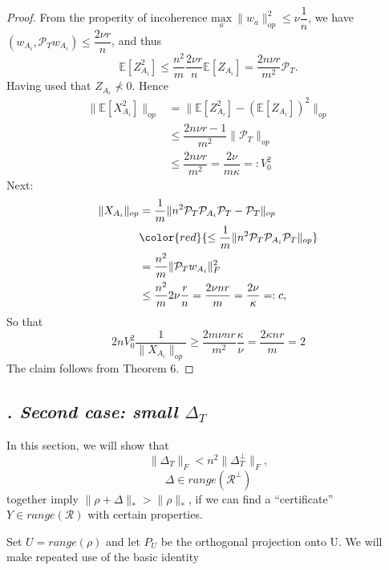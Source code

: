 \documentclass{article}
\begin{document}
\begin{proof}
From the properity of incoherence $\underset{a} {\mathrm{max}} ~\|w_a\|_{op}^2 \le \nu \dfrac{1}{n}$, we have $(w_{A_i},\mathcal{P}_Tw_{A_i}) \le \dfrac{2\nu r}{n}$, and thus
\[
\mathbb{E}[Z_{A_i}^2] \le \dfrac{n^2}{m}\dfrac{2\nu r}{n}\mathbb{E}[Z_{A_i}] = \dfrac{2n\nu r}{m^2}\mathcal{P}_T.
\]
Having used that $Z_{A_i}\not\prec	0$. Hence
\begin{align*}
\|\mathbb{E}[X_{A_i}^2]\|_{op} 
& = \|\mathbb{E}[Z_{A_i}^2]-\left(\mathbb{E}[Z_{A_i}]\right)^2\|_{op}\\
& \le \dfrac{2n\nu r -1}{m^2} \|\mathcal{P}_T\|_{op}\\ 
&\le \dfrac{2n\nu r}{m^2} = \dfrac{2\nu}{m\kappa}=: V_0^2 
\end{align*}
Next:
\begin{align*}
\|X_{A_i}\|_{op} & = \dfrac{1}{m}\|n^2\mathcal{P}_T \mathcal{P}_{A_i} \mathcal{P}_T - \mathcal{P}_T\|_{op}\\
&\color{red}{ \le \dfrac{1}{m}\|n^2\mathcal{P}_T \mathcal{P}_{A_i} \mathcal{P}_T \|_{op}}\\
& = \dfrac{n^2}{m}\|\mathcal{P}_T w_{A_i}\|_F^2\\
& \le \dfrac{n^2}{m}2\nu \dfrac{r}{n} = \dfrac{2\nu nr}{m} = \dfrac{2\nu }{\kappa} =:c,
\end{align*}
So that 
\[
2nV_0^2\dfrac{1}{\|X_{A_i}\|_{op}} \ge \dfrac{2m\nu nr}{m^2}\dfrac{\kappa}{\nu} = \dfrac{2\kappa nr}{m} = 2
\]
The claim follows from Theorem 6.
\color{red}{After applied theorem 6, we got coefficient as 2n. No idea where comes 4nr in the theorem 5}
\end{proof}



\subsection{\textit{\uppercase\expandafter{}. Second case: small $\Delta_T$}}

In this section, we will show that 
\begin{equation}
\|\Delta_T\|_F < n^2\|\Delta_T^\perp\|_F,
\label{eq:28}
\end{equation}
\begin{equation}
\Delta \in range(\mathcal{R}^\perp)
\label{eq:29}
\end{equation}
together imply $\|\rho+\Delta\|_* > \|\rho\|_*$, if we can find a ``certificate'' $Y \in range(\mathcal{R})$ with certain properties. 

Set $U = range (\rho)$ and let $P_U$ be the orthogonal projection onto U. We will make repeated use of the basic identity
\end{document}
